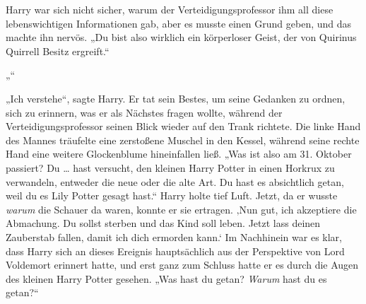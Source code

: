 Harry war sich nicht sicher, warum der Verteidigungsprofessor ihm all diese lebenswichtigen Informationen gab, aber es musste einen Grund geben, und das machte ihn nervös.
„Du bist also wirklich ein körperloser Geist, der von Quirinus Quirrell Besitz ergreift.“

„“

„Ich verstehe“, sagte Harry.
Er tat sein Bestes, um seine Gedanken zu ordnen, sich zu erinnern, was er als Nächstes fragen wollte, während der Verteidigungsprofessor seinen Blick wieder auf den Trank richtete. Die linke Hand des Mannes träufelte eine zerstoßene Muschel in den Kessel, während seine rechte Hand eine weitere Glockenblume hineinfallen ließ.
„Was ist also am 31. Oktober passiert? Du … hast versucht, den kleinen Harry Potter in einen Horkrux zu verwandeln, entweder die neue oder die alte Art. Du hast es absichtlich getan, weil du es Lily Potter gesagt hast.“
Harry holte tief Luft. Jetzt, da er wusste \emph{warum} die Schauer da waren, konnte er sie ertragen.
‚Nun gut, ich akzeptiere die Abmachung. Du sollst sterben und das Kind soll leben. Jetzt lass deinen Zauberstab fallen, damit ich dich ermorden kann.‘
Im Nachhinein war es klar, dass Harry sich an dieses Ereignis hauptsächlich aus der Perspektive von Lord Voldemort erinnert hatte, und erst ganz zum Schluss hatte er es durch die Augen des kleinen Harry Potter gesehen.
„Was hast du getan? \emph{Warum} hast du es getan?“

